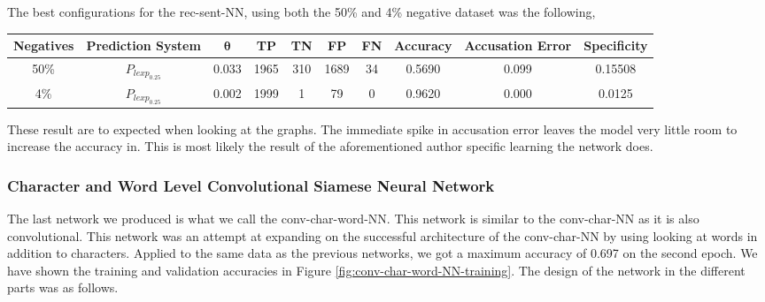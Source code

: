 The best configurations for the \gls{rec-sent-NN}, using both the 50\% and 4\%
negative dataset was the following,

\begin{center}
    \begin{adjustbox}{center}
    \scriptsize
    \begin{tabular}{|c|c|c|c|c|c|c|c|c|c|}
        \hline
        \textbf{Negatives} & \textbf{Prediction System} & $\mathbf{\theta}$ & \textbf{TP} & \textbf{TN} & \textbf{FP} & \textbf{FN} &
        \textbf{Accuracy} & \textbf{Accusation Error} & \textbf{Specificity}
        \\ \hline
        50\%      & $P_{lexp_{0.25}}$ & 0.033    & 1965 & 310 & 1689 & 34  &
        0.5690    & 0.099 & 0.15508
        \\ \hline
        4\%       & $P_{lexp_{0.25}}$ & 0.002    & 1999 & 1   & 79   & 0   &
        0.9620    & 0.000 & 0.0125
        \\ \hline
    \end{tabular}
    \end{adjustbox}
\end{center}

These result are to expected when looking at the graphs. The immediate spike in
accusation error leaves the model very little room to increase the accuracy in.
This is most likely the result of the aforementioned author specific learning
the network does.


\subsubsection{Character and Word Level Convolutional Siamese Neural Network}
\label{subsubsec:conv_char_word_nn}

The last network we produced is what we call the \gls{conv-char-word-NN}. This
network is similar to the \gls{conv-char-NN} as it is also convolutional. This
network was an attempt at expanding on the successful architecture of the
\gls{conv-char-NN} by using looking at words in addition to characters. Applied
to the same data as the previous networks, we got a maximum accuracy of 0.697 on
the second epoch. We have shown the training and validation accuracies in Figure
\ref{fig:conv-char-word-NN-training}. The design of the network in the different
parts was as follows.


